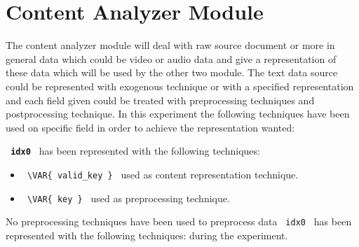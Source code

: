 

\section{Content Analyzer Module}\label{sec:ca}
The content analyzer module will deal with raw source document or more in general data which could be
video or audio data and give a representation of these data which will be used by the other two module.
The text data source could be represented with exogenous technique or with a specified representation
and each field given could be treated with preprocessing techniques and postprocessing technique.
In this experiment the following techniques have been used on specific field in order to achieve the
representation wanted:
\hfill\break
\hfill\break



\textbf{\lstinline[style=verbatim-text]| idx0 |} has been represented with the following techniques:

\begin{itemize}

        \item
        \verb| \VAR{ valid_key } | used as content representation technique.
\end{itemize}




\begin{itemize}
    \item
     \verb| \VAR{ key } | used as preprocessing technique.
\end{itemize}
No preprocessing techniques have been used to preprocess data \lstinline[style=verbatim-text]| idx0 | has been represented with the following techniques:
 during the experiment.





